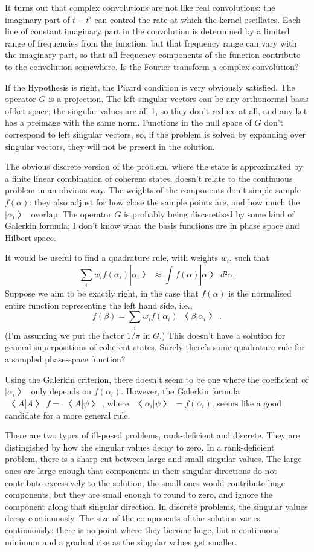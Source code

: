 It turns out that complex convolutions are not like real convolutions: the imaginary part of $t-t'$ can control the rate at which the kernel oscillates.  Each line of constant imaginary part in the convolution is determined by a limited range of frequencies from the function, but that frequency range can vary with the imaginary part, so that all frequency components of the function contribute to the convolution somewhere.  Is the Fourier transform a complex convolution?

If the Hypothesis is right, the Picard condition is very obviously satisfied.  The operator $G$ is a projection.  The left singular vectors can be any orthonormal basis of ket space; the singular values are all 1, so they don't reduce at all, and any ket has a preimage with the same norm.  Functions in the null space of $G$ don't correspond to left singular vectors, so, if the problem is solved by expanding over singular vectors, they will not be present in the solution. 


The obvious discrete version of the problem, where the state is approximated by a finite linear combination of coherent states, doesn't relate to the continuous problem in an obvious way.  The weights of the components don't simple sample $f(α)$: they also adjust for how close the sample points are, and how much the $|α_i〉$ overlap.  The operator $G$ is probably being disceretised by some kind of Galerkin formula; I don't know what the basis functions are in phase space and Hilbert space.

It would be useful to find a quadrature rule, with weights $w_i$, such that 
$$∑_i w_if(α_i)|α_i〉≈\int f(α)|α〉d²α.$$
Suppose we aim to be exactly right, in the case that $f(α)$ is the normalised entire function representing the left hand side, i.e.,
$$f(β)=∑_i w_if(α_i)〈β|α_i〉.$$
(I'm assuming we put the factor $1/π$ in $G$.)  This doesn't have a solution for general superpositions of coherent states.  Surely there's some quadrature rule for a sampled phase-space function?

Using the Galerkin criterion, there doesn't seem to be one where the coefficient of $|α_i〉$ only depends on $f(α_i)$.  However, the Galerkin formula $〈A|A〉f=〈A|ψ〉$, where $〈α_i|ψ〉=f(α_i)$, seems like a good candidate for a more general rule.

There are two types of ill-posed problems, rank-deficient and discrete.  They are distingished by how the singular values decay to zero.  In a rank-deficient problem, there is a sharp cut between large and small singular values.  The large ones are large enough that components in their singular directions do not contribute excessively to the solution, the small ones would contribute huge components, but they are small enough to round to zero, and ignore the component along that singular direction.  In discrete problems, the singular values decay continuously.  The size of the components of the solution varies continuously: there is no point where they become huge, but a continuous minimum and a gradual rise as the singular values get smaller.

